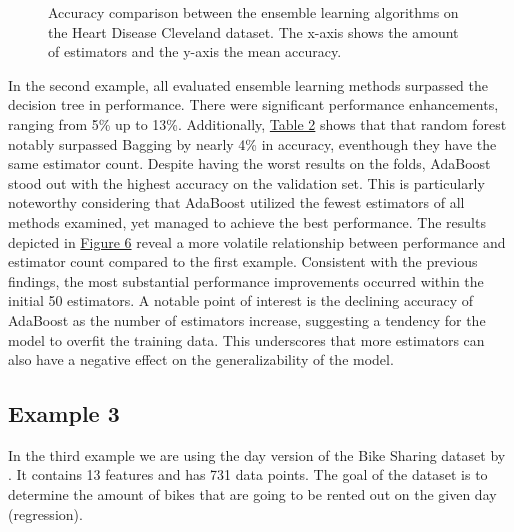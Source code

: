 

\begin{figure}[htbp]
    \centering
    \label{fig:hdc_comparison}
    \caption{
        Accuracy comparison between the ensemble learning algorithms on the Heart Disease Cleveland dataset.
        The x-axis shows the amount of estimators and the y-axis the mean accuracy.
    }
\end{figure}

In the second example, all evaluated ensemble learning methods surpassed the decision tree in performance.
There were significant performance enhancements, ranging from 5\% up to 13\%.
Additionally, \hyperref[tab:hdc_table]{Table 2} shows that that random forest notably surpassed Bagging by
nearly 4\% in accuracy, eventhough they have the same estimator count.
Despite having the worst results on the folds, AdaBoost stood out with the highest accuracy on the validation set.
This is particularly noteworthy considering that AdaBoost utilized the fewest estimators of all methods examined,
yet managed to achieve the best performance.
The results depicted in \hyperref[fig:hdc_comparison]{Figure 6} reveal a more volatile relationship between
performance and estimator count compared to the first example. Consistent with the previous findings, the most
substantial performance improvements occurred within the initial 50 estimators.
A notable point of interest is the declining accuracy of AdaBoost as the number of estimators increase, suggesting
a tendency for the model to overfit the training data.
This underscores that more estimators can also have a negative effect on the generalizability of the model. 

\newpage %
\subsection{Example 3}
In the third example we are using the day version of the Bike Sharing dataset by
\citet*{bike_sharing}. It contains 13 features and has 731 data 
points. The goal of the dataset is to determine the amount of bikes that are going
to be rented out on the given day (regression).

